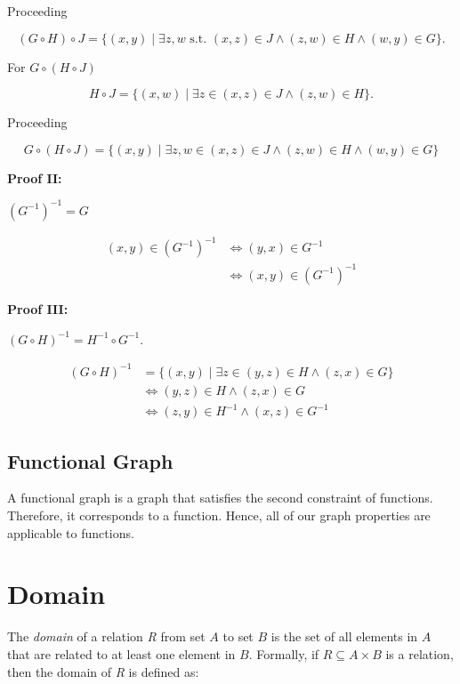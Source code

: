 Proceeding 

\[
	(G \circ H) \circ J = \{(x, y) \mid \exists z,w \text{ s.t. }  (x, z) \in J \land  (z, w) \in H \land (w, y) \in G  \}.
\]

For \(G \circ (H \circ J)\)

\[
	H \circ J = \{(x, w) \mid \exists z \in (x, z) \in J \land (z, w) \in H\}.
\]

Proceeding

\[
	G \circ (H \circ J) = \{(x, y) \mid \exists z,w \in  (x, z) \in J \land  (z, w) \in H \land (w, y) \in G  \} 
\]

\QED

\textbf{Proof II:}

\((G^{-1})^{-1} = G\)

\begin{align*}
	(x, y) \in (G^{-1})^{-1} &\iff (y, x) \in G^{-1} \\ 
	&\iff (x, y) \in (G^{-1})^{-1}
\end{align*}

\QED

\textbf{Proof III:}

\((G \circ H)^{-1} = H^{-1} \circ G^{-1}\).

\begin{align*}	
    (G \circ H)^{-1} &=  \{(x, y) \mid \exists z \in (y, z) \in H \land (z, x) \in G\} \\ 
	&\iff (y, z) \in H \land (z, x) \in G \\
	&\iff (z, y) \in H^{-1} \land (x, z) \in G^{-1} 
\end{align*}

\QED

\subsection{Functional Graph}

A functional graph is a graph that satisfies the second constraint of functions. Therefore, it corresponds to a function. Hence, 
all of our graph properties are applicable to functions.

\section{Domain}

The \emph{domain} of a relation \emph{R} from set \(A\) to set \(B\) is the set of all elements in 
\(A\) that are related to at least one element in \(B\). Formally, if \(R \subseteq A \times B\) 
is a relation, then the domain of \emph{R} is defined as:

